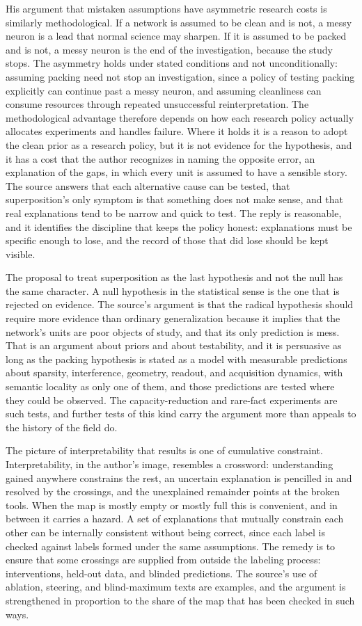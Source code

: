 \documentclass[11pt]{article}
\begin{document}
His argument that mistaken assumptions have asymmetric research costs is similarly methodological. If a network is assumed to be clean and is not, a messy neuron is a lead that normal science may sharpen. If it is assumed to be packed and is not, a messy neuron is the end of the investigation, because the study stops. The asymmetry holds under stated conditions and not unconditionally: assuming packing need not stop an investigation, since a policy of testing packing explicitly can continue past a messy neuron, and assuming cleanliness can consume resources through repeated unsuccessful reinterpretation. The methodological advantage therefore depends on how each research policy actually allocates experiments and handles failure. Where it holds it is a reason to adopt the clean prior as a research policy, but it is not evidence for the hypothesis, and it has a cost that the author recognizes in naming the opposite error, an explanation of the gaps, in which every unit is assumed to have a sensible story. The source answers that each alternative cause can be tested, that superposition's only symptom is that something does not make sense, and that real explanations tend to be narrow and quick to test. The reply is reasonable, and it identifies the discipline that keeps the policy honest: explanations must be specific enough to lose, and the record of those that did lose should be kept visible.

The proposal to treat superposition as the last hypothesis and not the null has the same character. A null hypothesis in the statistical sense is the one that is rejected on evidence. The source's argument is that the radical hypothesis should require more evidence than ordinary generalization because it implies that the network's units are poor objects of study, and that its only prediction is mess. That is an argument about priors and about testability, and it is persuasive as long as the packing hypothesis is stated as a model with measurable predictions about sparsity, interference, geometry, readout, and acquisition dynamics, with semantic locality as only one of them, and those predictions are tested where they could be observed. The capacity-reduction and rare-fact experiments are such tests, and further tests of this kind carry the argument more than appeals to the history of the field do.

The picture of interpretability that results is one of cumulative constraint. Interpretability, in the author's image, resembles a crossword: understanding gained anywhere constrains the rest, an uncertain explanation is pencilled in and resolved by the crossings, and the unexplained remainder points at the broken tools. When the map is mostly empty or mostly full this is convenient, and in between it carries a hazard. A set of explanations that mutually constrain each other can be internally consistent without being correct, since each label is checked against labels formed under the same assumptions. The remedy is to ensure that some crossings are supplied from outside the labeling process: interventions, held-out data, and blinded predictions. The source's use of ablation, steering, and blind-maximum texts are examples, and the argument is strengthened in proportion to the share of the map that has been checked in such ways.
\end{document}
